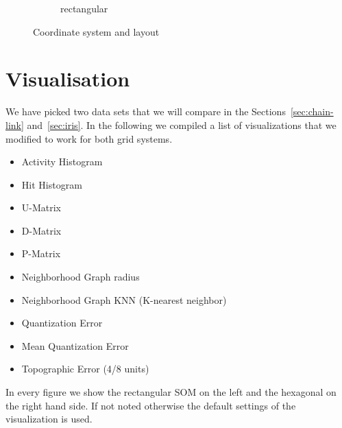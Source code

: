 \documentclass{acm_proc_article-sp}
\begin{document}
\begin{figure}
\begin{subfigure}{1\linewidth}
    \caption{rectangular}
    \label{fig:hci-coord-rect}
    \end{subfigure}
    \caption{Coordinate system and layout}
    \label{fig:hci-coord}
\end{figure}

\section{Visualisation}

We have picked two data sets that we will compare in the Sections~\ref{sec:chain-link} and~\ref{sec:iris}. In the following we compiled a list of visualizations that we modified to work for both grid systems.

\begin{itemize}
	\item Activity Histogram
	\item Hit Histogram
	\item U-Matrix
	\item D-Matrix
	\item P-Matrix
	\item Neighborhood Graph radius
	\item Neighborhood Graph KNN (K-nearest neighbor)

	\item Quantization Error
	\item Mean Quantization Error
	\item Topographic Error (4/8 units)
\end{itemize}

In every figure we show the rectangular SOM on the left and the hexagonal on the right hand side.
If not noted otherwise the default settings of the visualization is used.

\newcommand{\cmprecthex}[5]
{
	\begin{figure}
		\begin{subfigure}{0.49\linewidth}
			\texttt{[image: img/\#1-\#2]}
			\caption{#5}
			\label{fig:#1-#2-rect}
		\end{subfigure}
		\begin{subfigure}{0.49\linewidth}
			\texttt{[image: img/\#1-\#2-hex]}
			\caption{#4}
			\label{fig:#1-#2-hex}
		\end{subfigure}
		\caption{#3}
		\label{fig:#1-#2}
	\end{figure}
}
\end{document}
